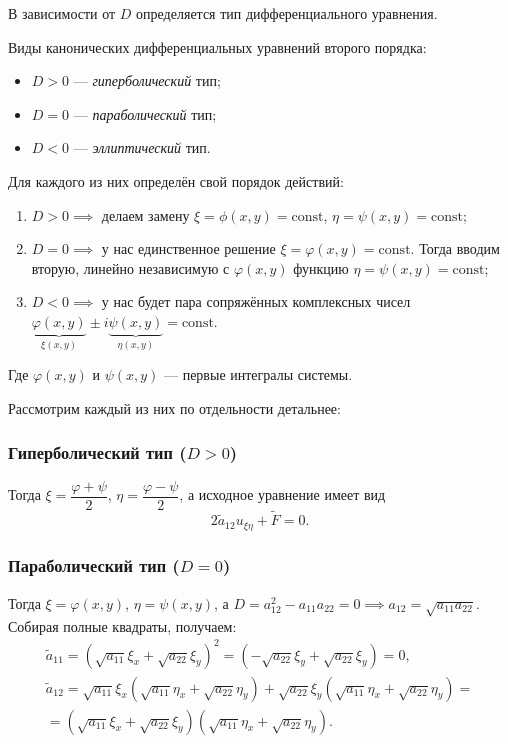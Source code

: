В зависимости от $D$ определяется тип дифференциального уравнения.

\begin{remark}
    Виды канонических дифференциальных уравнений второго порядка:
    \begin{itemize}
        \item $D > 0$ — \textit{гиперболический} тип;
        \item $D = 0$ — \textit{параболический} тип;
        \item $D < 0$ — \textit{эллиптический} тип.
    \end{itemize}
\end{remark}

Для каждого из них определён свой порядок действий:
\begin{enumerate}
    \item $D > 0 \implies$ делаем замену $\xi = \phi(x, y) = \text{const}$, $\eta = \psi(x, y) = \text{const}$;
    \item $D = 0 \implies$ у нас единственное решение $\xi = \varphi(x, y) = \text{const}$. Тогда вводим вторую, линейно независимую с $\varphi(x, y)$ функцию $\eta = \psi(x, y) = \text{const}$;
    \item $D < 0 \implies$ у нас будет пара сопряжённых комплексных чисел $\underbrace{\varphi(x, y)}_{\xi(x, y)} \pm i \underbrace{\psi(x, y)}_{\eta(x, y)} = \text{const}$.
\end{enumerate}

\begin{remark}
    Где $\varphi(x, y)$ и $\psi(x, y)$ — первые интегралы системы.
\end{remark}

Рассмотрим каждый из них по отдельности детальнее:

\subsubsection*{Гиперболический тип ($D > 0$)}
Тогда $\xi = \dfrac{\varphi + \psi}{2}$, $\eta = \dfrac{\varphi - \psi}{2}$, а исходное уравнение имеет вид
$$ 2 \tilde{a}_{12} u_{\xi \eta} + \tilde{F} = 0. $$

\subsubsection*{Параболический тип ($D = 0$)}
Тогда $\xi = \varphi(x, y)$, $\eta = \psi(x, y)$, а $D = a_{12}^2 - a_{11} a_{22} = 0 \implies a_{12} = \sqrt{a_{11} a_{22}}$. Собирая полные квадраты, получаем:
$$
\begin{matrix}
\tilde{a}_{11} = (\sqrt{a_{11}} \xi_x + \sqrt{a_{22}} \xi_y)^2 = (-\sqrt{a_{22}} \xi_y + \sqrt{a_{22}} \xi_y) = 0, \\
\tilde{a}_{12} = \sqrt{a_{11}} \xi_x (\sqrt{a_{11}} \eta_x + \sqrt{a_{22}} \eta_y) + \sqrt{a_{22}} \xi_y (\sqrt{a_{11}} \eta_x + \sqrt{a_{22}} \eta_y) = \\
= (\sqrt{a_{11}} \xi_x + \sqrt{a_{22}} \xi_y)(\sqrt{a_{11}} \eta_x + \sqrt{a_{22}} \eta_y).
\end{matrix}
$$

